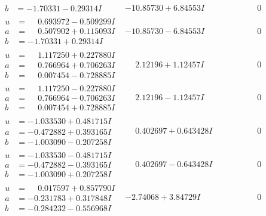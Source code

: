 \documentclass[1p]{elsarticle_modified}
\theoremstyle{definition}
\begin{document}
$$\begin{array}{c|c|c}
\begin{aligned}
b &= -1.70331 - 0.29314 I\end{aligned}
 & -10.85730 + 6.84553 I & \phantom{-0.000000 } 0 \\ \hline\begin{aligned}
u &= \phantom{-}0.693972 - 0.509299 I \\
a &= \phantom{-}0.507902 + 0.115093 I \\
b &= -1.70331 + 0.29314 I\end{aligned}
 & -10.85730 - 6.84553 I & \phantom{-0.000000 } 0 \\ \hline\begin{aligned}
u &= \phantom{-}1.117250 + 0.227880 I \\
a &= \phantom{-}0.766964 + 0.706263 I \\
b &= \phantom{-}0.007454 - 0.728885 I\end{aligned}
 & \phantom{-}2.12196 + 1.12457 I & \phantom{-0.000000 } 0 \\ \hline\begin{aligned}
u &= \phantom{-}1.117250 - 0.227880 I \\
a &= \phantom{-}0.766964 - 0.706263 I \\
b &= \phantom{-}0.007454 + 0.728885 I\end{aligned}
 & \phantom{-}2.12196 - 1.12457 I & \phantom{-0.000000 } 0 \\ \hline\begin{aligned}
u &= -1.033530 + 0.481715 I \\
a &= -0.472882 + 0.393165 I \\
b &= -1.003090 - 0.207258 I\end{aligned}
 & \phantom{-}0.402697 + 0.643428 I & \phantom{-0.000000 } 0 \\ \hline\begin{aligned}
u &= -1.033530 - 0.481715 I \\
a &= -0.472882 - 0.393165 I \\
b &= -1.003090 + 0.207258 I\end{aligned}
 & \phantom{-}0.402697 - 0.643428 I & \phantom{-0.000000 } 0 \\ \hline\begin{aligned}
u &= \phantom{-}0.017597 + 0.857790 I \\
a &= -0.231783 + 0.317848 I \\
b &= -0.284232 - 0.556968 I\end{aligned}
 & -2.74068 + 3.84729 I & \phantom{-0.000000 } 0 \\ \hline\begin{aligned}

\end{aligned}
\end{array}$$
\end{document}
